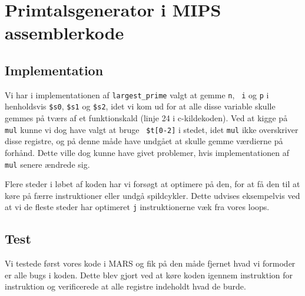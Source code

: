 \section{Primtalsgenerator i MIPS assemblerkode}
\subsection{Implementation}
Vi har i implementationen af {\tt largest\_prime} valgt at gemme {\tt n}, {\tt
i} og {\tt p} i henholdsvis {\tt \$s0}, {\tt \$s1} og {\tt \$s2}, idet vi kom ud
for at alle disse variable skulle gemmes på tværs af et funktionskald (linje 24
i c-kildekoden). Ved at kigge på {\tt mul} kunne vi dog have valgt at bruge {\tt
\$t[0-2]} i stedet, idet {\tt mul} ikke overskriver disse registre, og på denne
måde have undgået at skulle gemme værdierne på forhånd. Dette ville dog kunne
have givet problemer, hvis implementationen af {\tt mul} senere ændrede sig.

Flere steder i løbet af koden har vi forsøgt at optimere på den, for at få den
til at køre på færre instruktioner eller undgå spildcykler. Dette udvises eksempelvis
ved at vi de fleste steder har optimeret {\tt j} instruktionerne væk fra vores
loops.

\subsection{Test}
Vi testede først vores kode i MARS og fik på den måde
fjernet hvad vi formoder er alle bugs i koden. Dette blev gjort ved at køre
koden igennem instruktion for instruktion og verificerede at alle registre
indeholdt hvad de burde.
